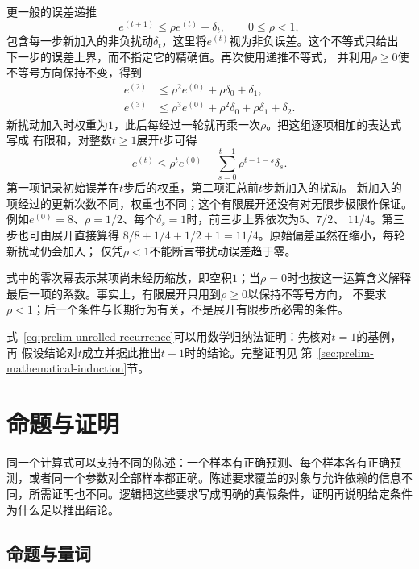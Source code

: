 更一般的误差递推
\begin{equation}
  e^{(t+1)}\leq \rho e^{(t)}+\delta_t,
  \qquad 0\leq\rho<1,
  \label{eq:prelim-perturbed-recurrence}
\end{equation}
包含每一步新加入的非负扰动$\delta_t$，这里将$e^{(t)}$视为非负误差。这个不等式只给出
下一步的误差上界，而不指定它的精确值。再次使用递推不等式，
并利用$\rho\geq0$使不等号方向保持不变，得到
\[
  \begin{aligned}
    e^{(2)}&\leq\rho^2e^{(0)}+\rho\delta_0+\delta_1,\\
    e^{(3)}&\leq\rho^3e^{(0)}+\rho^2\delta_0+\rho\delta_1+\delta_2.
  \end{aligned}
\]
新扰动加入时权重为$1$，此后每经过一轮就再乘一次$\rho$。把这组逐项相加的表达式写成
有限和，对整数$t\geq1$展开$t$步可得
\begin{equation}
  e^{(t)}
  \leq
  \rho^t e^{(0)}
  +
  \sum_{s=0}^{t-1}\rho^{t-1-s}\delta_s.
  \label{eq:prelim-unrolled-recurrence}
\end{equation}
第一项记录初始误差在$t$步后的权重，第二项汇总前$t$步新加入的扰动。
新加入的项经过的更新次数不同，权重也不同；这个有限展开还没有对无限步极限作保证。
例如$e^{(0)}=8$、$\rho=1/2$、每个$\delta_s=1$时，前三步上界依次为$5$、$7/2$、
$11/4$。第三步也可由展开直接算得
$8/8+1/4+1/2+1=11/4$。原始偏差虽然在缩小，每轮新扰动仍会加入；
仅凭$\rho<1$不能断言带扰动误差趋于零。

式中的零次幂表示某项尚未经历缩放，即空积$1$；当$\rho=0$时也按这一运算含义解释
最后一项的系数。事实上，有限展开只用到$\rho\geq0$以保持不等号方向，
不要求$\rho<1$；后一个条件与长期行为有关，不是展开有限步所必需的条件。

式~\eqref{eq:prelim-unrolled-recurrence}可以用数学归纳法证明：先核对$t=1$的基例，再
假设结论对$t$成立并据此推出$t+1$时的结论。完整证明见
第~\ref{sec:prelim-mathematical-induction}节。

\section{命题与证明}
\label{sec:prelim-propositions-quantifiers}

同一个计算式可以支持不同的陈述：一个样本有正确预测、每个样本各有正确预测，或者同一个参数对全部样本都正确。陈述要求覆盖的对象与允许依赖的信息不同，所需证明也不同。逻辑把这些要求写成明确的真假条件，证明再说明给定条件为什么足以推出结论。

\subsection{命题与量词}
\label{sec:prelim-statements-quantifiers}

